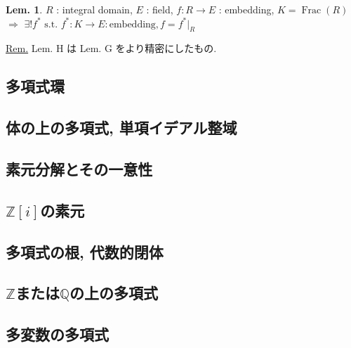 \documentclass[uplatex,dvipdfmx,9pt]{beamer}
\newcommand{\st}{\text{ s.t. }}
\newcommand{\Frac}[1]{\operatorname{Frac}(#1)}
\newcommand{\Z}{\mathbb{Z}}
\newcommand{\Q}{\mathbb{Q}}
\newcommand{\sscount}{\textsection \thesubsection}
\newcounter{textLemCount}
\newcounter{textExmCount}
\theoremstyle{definition} %
\newtheorem{lemText}[textLemCount]{Lem.} %
\theoremstyle{example}
\begin{document}
    \begin{frame}

      \begin{lemText}
        $R$ : integral domain, $E$ : field, $f\colon R \to E$ : embedding, $K = \Frac{R}$ \\
        $\Rightarrow$ $\exists! f^* \st f^*\colon K \to E : \text{embedding}, f = f^*\vert_R$
      \end{lemText}
      \underline{Rem.} Lem. H は Lem. G をより精密にしたもの.
      
    \end{frame}

    \subsection{\sscount 多項式環}
    \setcounter{textExmCount}{0}

    \subsection{\sscount 体の上の多項式, 単項イデアル整域}
    \setcounter{textExmCount}{0}

    \subsection{\sscount 素元分解とその一意性}
    \setcounter{textExmCount}{0}

    \subsection{\sscount \texorpdfstring{ $\Z[i]$}{Z[i]}の素元}
    \setcounter{textExmCount}{0}

    \subsection{\sscount 多項式の根, 代数的閉体}
    \setcounter{textExmCount}{0}

    \subsection{\sscount \texorpdfstring{ $\Z$または$\Q$}{ZまたはQ}の上の多項式}
    \setcounter{textExmCount}{0}

    \subsection{\sscount 多変数の多項式}
    \setcounter{textExmCount}{0}
\end{document}
